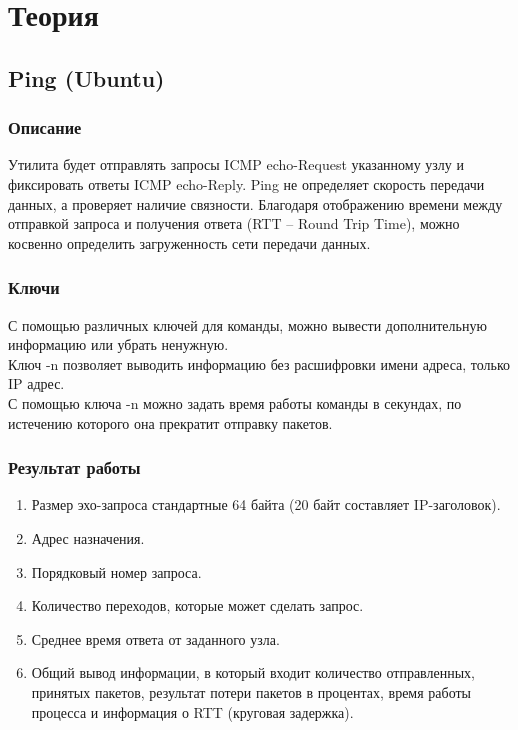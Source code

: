\chapter{Теория}

\section{Ping (Ubuntu)}

\subsection{Описание}
Утилита будет отправлять запросы ICMP echo-Request указанному узлу и фиксировать
ответы ICMP echo-Reply. Ping не определяет скорость передачи данных, а проверяет наличие
связности. Благодаря отображению времени между отправкой запроса и получения ответа
(RTT – Round Trip Time), можно косвенно определить загруженность сети передачи данных. \\

\subsection{Ключи}

С помощью различных ключей для команды, можно вывести дополнительную информацию
или убрать ненужную. \\

Ключ -n позволяет выводить информацию без расшифровки имени адреса, только IP
адрес. \\

С помощью ключа -n можно задать время работы команды в секундах, по истечению
которого она прекратит отправку пакетов.

\subsection{Результат работы}
\begin{enumerate}
    \item Размер эхо-запроса стандартные 64 байта (20 байт составляет IP-заголовок).
    \item Адрес назначения.
    \item Порядковый номер запроса.
    \item Количество переходов, которые может сделать запрос.
    \item Среднее время ответа от заданного узла.
    \item Общий вывод информации, в который входит количество отправленных, принятых пакетов, результат потери пакетов в процентах, время работы процесса и информация о
RTT (круговая задержка).
\end{enumerate}

